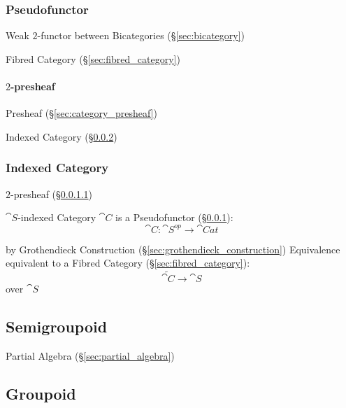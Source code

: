 \subsubsection{Pseudofunctor}\label{sec:pseudofunctor}

Weak $2$-functor between Bicategories (\S\ref{sec:bicategory})

Fibred Category (\S\ref{sec:fibred_category})



\paragraph{$2$-presheaf}\label{sec:2_presheaf}

Presheaf (\S\ref{sec:category_presheaf})

Indexed Category (\S\ref{sec:indexed_category})



\subsubsection{Indexed Category}\label{sec:indexed_category}

$2$-presheaf (\S\ref{sec:2_presheaf})

$\cat{S}$-indexed Category $\cat{C}$ is a Pseudofunctor
(\S\ref{sec:pseudofunctor}):
\[
  \cat{C}: \cat{S}^{op} \rightarrow \cat{Cat}
\]

by Grothendieck Construction (\S\ref{sec:grothendieck_construction})
Equivalence equivalent to a Fibred Category
(\S\ref{sec:fibred_category}):
\[
  \tilde{\cat{C}} \rightarrow \cat{S}
\]
over $\cat{S}$



\subsection{Semigroupoid}\label{sec:semigroupoid}

Partial Algebra (\S\ref{sec:partial_algebra})



\subsection{Groupoid}\label{sec:groupoid}

